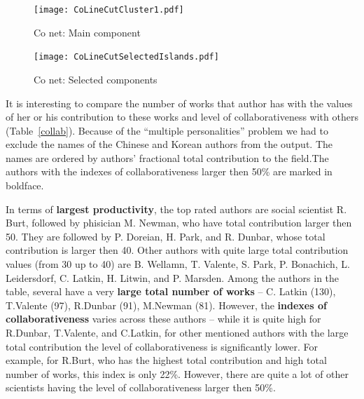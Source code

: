 \documentclass[11pt]{article} %
\begin{document}
\begin{figure}
\begin{center}
\texttt{[image: CoLineCutCluster1.pdf]}
\end{center}
\caption{Co net: Main component} \label{CoMain}
\end{figure}

\begin{figure}
\begin{center}
\texttt{[image: CoLineCutSelectedIslands.pdf]}
\end{center}
\caption{Co net: Selected components} \label{CoSelected}
\end{figure}

It is interesting to compare the number of works that author has with the values of her or his contribution to these works and level of collaborativeness with others (Table~\ref{collab}). Because of the ``multiple personalities'' problem we had to exclude the names of the Chinese and Korean authors from the output. The names are ordered by authors' fractional total contribution to the field.The authors with the indexes of collaborativeness larger then 50\% are marked in boldface.\medskip  

In terms of \textbf{largest productivity}, the top rated authors are social scientist R. Burt, followed by phisician M. Newman, who have total contribution larger then 50. They are followed by P. Doreian, H. Park, and R. Dunbar, whose total contribution is larger then 40. Other authors with quite large total contribution values (from 30 up to 40) are B. Wellamn, T. Valente, S. Park, P. Bonachich, L. Leidersdorf, C. Latkin, H. Litwin, and P. Marsden. Among the authors in the table, several have a very \textbf{large total number of works} -- C. Latkin (130), T.Valente (97), R.Dunbar (91), M.Newman (81). However, the \textbf{indexes of collaborativeness} varies across these authors -- while it is quite high for R.Dunbar, T.Valente, and C.Latkin, for other mentioned authors with the large total contribution the level of collaborativeness is significantly lower. For example, for R.Burt, who has the highest total contribution and high total number of works, this index is only 22\%. However, there are quite a lot of other scientists having the level of collaborativeness larger then 50\%. \medskip 
\end{document}
